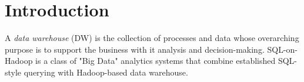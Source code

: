 \documentclass{sig-alternate-05-2015}
\begin{document}


%
%

%
%
\printccsdesc



\section{Introduction}
A \textit{data warehouse} (DW) is the collection of processes and data whose overarching purpose is to support the business with it analysis and decision-making. 
SQL-on-Hadoop is a class of "Big Data" analytics systems that combine established SQL-style querying with Hadoop-based data warehouse.
\end{document}
